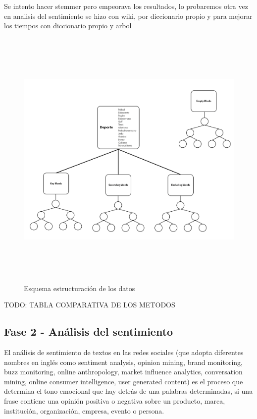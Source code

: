 \documentclass[../all.tex]{subfiles}
\begin{document}
Se intento hacer stemmer pero empeorava los resultados, lo probaremos otra vez en analisis del sentimiento
se hizo con wiki, por  diccionario propio y para mejorar los tiempos con diccionario propio y arbol

\begin{figure}[H]
    \centering
    \includegraphics[height=13cm, width=15cm]{imgs/treeScheme.png}
    \caption{Esquema estructuración de los datos}
\end{figure}

{\color{red} 
    TODO: TABLA COMPARATIVA DE LOS METODOS
}
\newpage
\subsection{Fase 2 - Análisis del sentimiento}
    El análisis de sentimiento de textos en las redes sociales (que adopta diferentes nombres en inglés como sentiment analysis, opinion mining, brand monitoring, buzz monitoring, online anthropology, market influence analytics, conversation mining, online consumer intelligence, user generated content) es el proceso que determina el tono emocional que hay detrás de una palabras determinadas, si una frase contiene una opinión positiva o negativa sobre un producto, marca, institución, organización, empresa, evento o persona.\\
    
\end{document}
